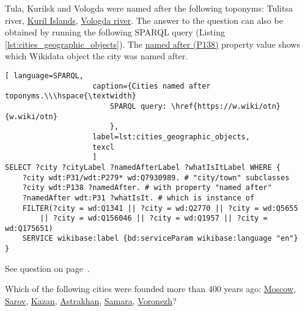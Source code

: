 Tula, Kurilsk and Vologda were named after the following toponyms: Tulitsa river, \href{https://w.wiki/qqJ}{Kuril Islands}, \href{https://w.wiki/qqK}{Vologda river}. The answer to the question can also be obtained by running the following SPARQL query (Listing \ref{lst:cities_geographic_objects}). The \href{https://www.wikidata.org/wiki/Property:P138}{named after (P138)} property value shows which Wikidata object the city was named after.
    
\begin{lstlisting}[ language=SPARQL, 
                    caption={Cities named after toponyms.\\\hspace{\textwidth}
                        SPARQL query: \href{https://w.wiki/otn}{w.wiki/otn}
                        },
                    label=lst:cities_geographic_objects,
                    texcl 
                    ]
SELECT ?city ?cityLabel ?namedAfterLabel ?whatIsItLabel WHERE {
	?city wdt:P31/wdt:P279* wd:Q7930989. # "city/town" subclasses
	?city wdt:P138 ?namedAfter. # with property "named after"
	?namedAfter wdt:P31 ?whatIsIt. # which is instance of
	FILTER(?city = wd:Q1341 || ?city = wd:Q2770 || ?city = wd:Q5655 
		|| ?city = wd:Q156046 || ?city = wd:Q1957 || ?city = wd:Q175651)
	SERVICE wikibase:label {bd:serviceParam wikibase:language "en"}
}
\end{lstlisting}%

See question on page~\pageref{question:cities_geographic_objects}.


\begin{exercise}%
    \label{answer:cities_over_400_age}
Which of the following cities were founded more than 400 years ago: \href{https://w.wiki/pzt}{Moscow}, \href{https://w.wiki/pzu}{Sarov}, \href{https://w.wiki/pzx}{Kazan}, \href{https://w.wiki/pzy}{Astrakhan}, \href{https://w.wiki/pzz}{Samara}, \href{https://w.wiki/pz$}{Voronezh}?
\end{exercise}

